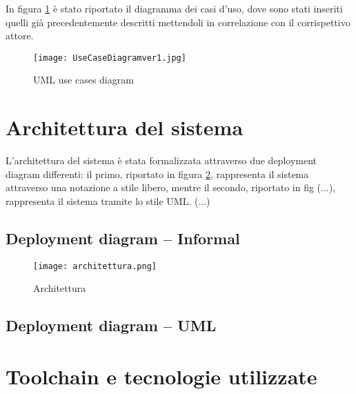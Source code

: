 In figura \ref{fig-uml-use-cases} è stato riportato il diagramma dei casi d'uso, dove sono stati inseriti quelli
già precedentemente descritti mettendoli in correlazione con il corrispettivo attore.

\begin{figure}[H]
      \centering
      \texttt{[image: UseCaseDiagramver1.jpg]}
      \caption{UML use cases diagram}
      \label{fig-uml-use-cases}
\end{figure}


\newpage
\section{Architettura del sistema}
L'architettura del sistema è stata formalizzata attraverso due deployment diagram differenti: 
il primo, riportato in figura \ref{architettura}, rappresenta il sistema
attraverso una notazione a stile libero, mentre il secondo, riportato in fig (...), rappresenta
il sistema tramite lo stile UML. (...)

\subsection{Deployment diagram -- Informal}
\begin{figure}[H]
      \centering
      \texttt{[image: architettura.png]}
      \caption{Architettura}
      \label{architettura}
\end{figure}



\subsection{Deployment diagram -- UML}

\section{Toolchain e tecnologie utilizzate}